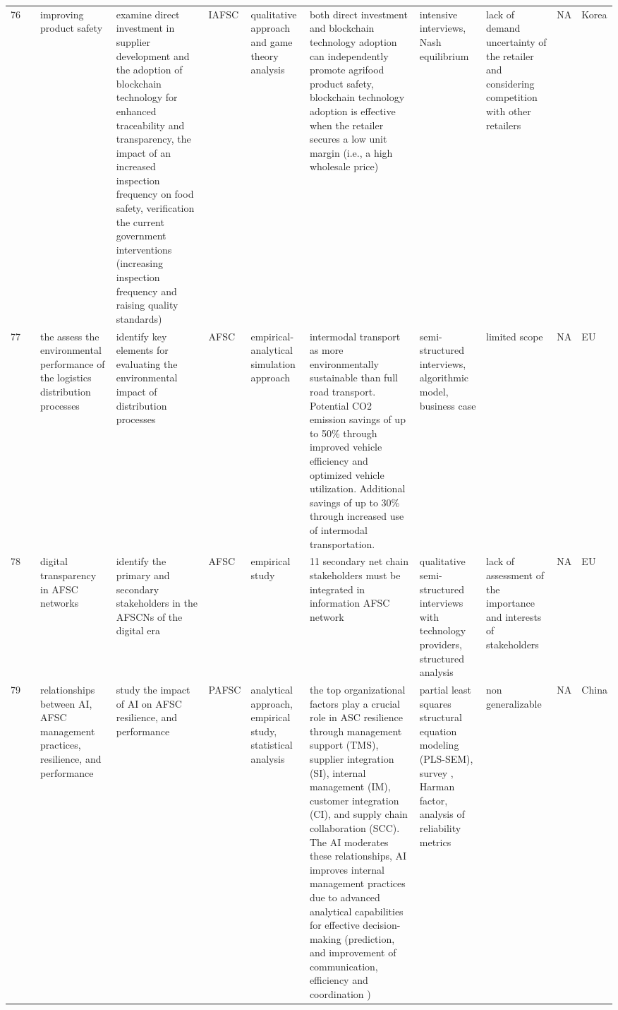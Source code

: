 \documentclass[a4paper,10pt]{article}
\begin{document}
\begin{landscape}
\begin{small}
\begin{longtable}{p{0.5cm} p{2cm} p{2.5cm} p{4cm} p{1cm} p{2.5cm} p{5.5cm} p{2.5cm} p{2.5cm} p{1.8cm} p{1.5cm}}
76 & \textcite{Bosung58} &improving product safety & examine  direct investment in supplier development and the adoption of blockchain technology for enhanced traceability and transparency, the impact of an increased inspection frequency on food safety, verification the current government interventions (increasing inspection frequency and raising quality standards) &IAFSC & qualitative approach and game theory analysis& both direct investment and blockchain technology adoption can independently promote agrifood product safety, blockchain technology adoption is effective when the retailer secures a low unit margin (i.e., a high wholesale price)&intensive interviews, Nash equilibrium & lack of demand uncertainty of the retailer and considering competition with other retailers& NA& Korea  \\
77 &\textcite{Barbieri59} & the assess the environmental performance of the logistics distribution processes& identify key elements for evaluating the environmental impact of distribution processes & AFSC &empirical-analytical simulation approach& intermodal transport as more environmentally sustainable than full road transport. Potential CO2 emission savings of up to 50\% through improved vehicle efficiency and optimized vehicle utilization. Additional savings of up to 30\% through increased use of intermodal transportation. &semi-structured interviews, algorithmic model, business case  & limited scope  & NA& EU \\
78 & \textcite{otter60} & digital transparency in AFSC networks & identify the primary and secondary stakeholders in the AFSCNs of the digital era & AFSC & empirical study& 11 secondary net chain stakeholders must be integrated in information AFSC network & qualitative semi-structured interviews with technology providers, structured  analysis & lack of assessment of the importance and interests of stakeholders & NA& EU \\
79 & \textcite{Yin61} &relationships between AI, AFSC management practices, resilience, and performance & study the impact of AI on  AFSC  resilience, and performance &PAFSC & analytical approach, empirical study, statistical analysis& the top organizational factors play a crucial role in ASC resilience through management support (TMS), supplier integration (SI), internal management (IM), customer integration (CI), and supply chain collaboration (SCC). The  AI moderates these relationships, AI improves internal management practices due to advanced analytical capabilities for effective decision-making (prediction, and improvement  of communication, efficiency  and coordination )& partial least squares structural equation modeling (PLS-SEM), survey , Harman factor, analysis of reliability metrics& non generalizable& NA& China  \\

\end{longtable}
\end{small}
\end{landscape}
\end{document}
